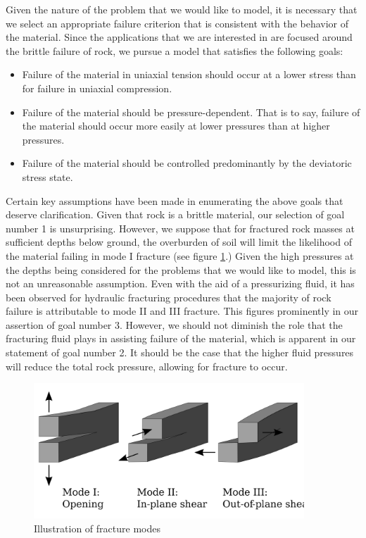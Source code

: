 \documentclass[11pt]{article} %
\begin{document}
Given the nature of the problem that we would like to model, it is necessary that we select an appropriate failure criterion that is consistent with the behavior of the material. Since the applications that we are interested in are focused around the brittle failure of rock, we pursue a model that satisfies the following goals:
\begin{itemize}
	\item[1] Failure of the material in uniaxial tension should occur at a lower stress than for failure in uniaxial compression.
	\item[2] Failure of the material should be pressure-dependent. That is to say, failure of the material should occur more easily at lower pressures than at higher pressures.
	\item[3] Failure of the material should be controlled predominantly by the deviatoric stress state.
\end{itemize}

Certain key assumptions have been made in enumerating the above goals that deserve clarification. Given that rock is a brittle material, our selection of goal number 1 is unsurprising. However, we suppose that for fractured rock masses at sufficient depths below ground, the overburden of soil will limit the likelihood of the material failing in mode I fracture (see figure \ref{fig:fracturemodes}.) Given the high pressures at the depths being considered for the problems that we would like to model, this is not an unreasonable assumption. Even with the aid of a pressurizing fluid, it has been observed for hydraulic fracturing procedures that the majority of rock failure is attributable to mode II and III fracture. This figures prominently in our assertion of goal number 3. However, we should not diminish the role that the fracturing fluid plays in assisting failure of the material, which is apparent in our statement of goal number 2. It should be the case that the higher fluid pressures will reduce the total rock pressure, allowing for fracture to occur.

\begin{figure} [!ht]
	\centering
	\includegraphics[width = 4.0in,trim=0 150 0 50,clip=true]{fracturemodes.png}
	\caption{Illustration of fracture modes}
	\label{fig:fracturemodes}
\end{figure}
\end{document}
